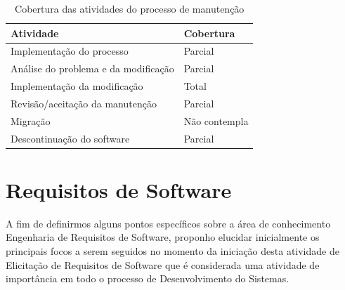     \begin{table}[htb]
      \begin{center}
        \begin{tabular}{| p{6cm} | l |}
        \hline
        \textbf{Atividade} & \textbf{Cobertura} \\ \hline
        Implementação do processo & Parcial \\ \hline
        Análise do problema e da modificação & Parcial \\ \hline
        Implementação da modificação & Total\\ \hline
        Revisão/aceitação da manutenção & Parcial \\ \hline
        Migração & Não contempla \\ \hline
        Descontinuação do software & Parcial \\ \hline
        \end{tabular}
      \end{center}
    \caption{Cobertura das atividades do processo de manutenção}
    \end{table}

\section{Requisitos de Software}
\label{sec:requisitos}

A fim de definirmos alguns pontos específicos sobre a área de conhecimento Engenharia de Requisitos de Software, proponho elucidar inicialmente os principais focos a serem seguidos no momento da iniciação desta atividade de Elicitação de Requisitos de Software que é considerada uma atividade de importância em todo o processo de Desenvolvimento do Sistemas. 

